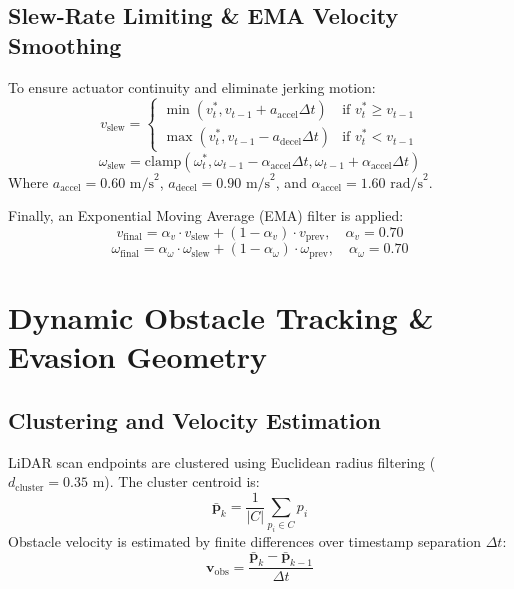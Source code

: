 \documentclass[10pt,a4paper]{article}
\begin{document}
\subsection{Slew-Rate Limiting \& EMA Velocity Smoothing}
To ensure actuator continuity and eliminate jerking motion:
\begin{equation}
v_{\text{slew}} = \begin{cases} 
\min(v_t^*, v_{t-1} + a_{\text{accel}}\Delta t) & \text{if } v_t^* \ge v_{t-1} \\
\max(v_t^*, v_{t-1} - a_{\text{decel}}\Delta t) & \text{if } v_t^* < v_{t-1}
\end{cases}
\end{equation}
\begin{equation}
\omega_{\text{slew}} = \text{clamp}\left(\omega_t^*, \omega_{t-1} - \alpha_{\text{accel}}\Delta t, \omega_{t-1} + \alpha_{\text{accel}}\Delta t\right)
\end{equation}
Where $a_{\text{accel}} = 0.60\text{ m/s}^2$, $a_{\text{decel}} = 0.90\text{ m/s}^2$, and $\alpha_{\text{accel}} = 1.60\text{ rad/s}^2$.

Finally, an Exponential Moving Average (EMA) filter is applied:
\begin{equation}
v_{\text{final}} = \alpha_v \cdot v_{\text{slew}} + (1 - \alpha_v) \cdot v_{\text{prev}}, \quad \alpha_v = 0.70
\end{equation}
\begin{equation}
\omega_{\text{final}} = \alpha_\omega \cdot \omega_{\text{slew}} + (1 - \alpha_\omega) \cdot \omega_{\text{prev}}, \quad \alpha_\omega = 0.70
\end{equation}

\section{Dynamic Obstacle Tracking \& Evasion Geometry}

\subsection{Clustering and Velocity Estimation}
LiDAR scan endpoints are clustered using Euclidean radius filtering ($d_{\text{cluster}} = 0.35\text{ m}$). The cluster centroid is:
\begin{equation}
\bar{\mathbf{p}}_k = \frac{1}{|C|} \sum_{p_i \in C} p_i
\end{equation}
Obstacle velocity is estimated by finite differences over timestamp separation $\Delta t$:
\begin{equation}
\mathbf{v}_{\text{obs}} = \frac{\bar{\mathbf{p}}_k - \bar{\mathbf{p}}_{k-1}}{\Delta t}
\end{equation}
\end{document}
